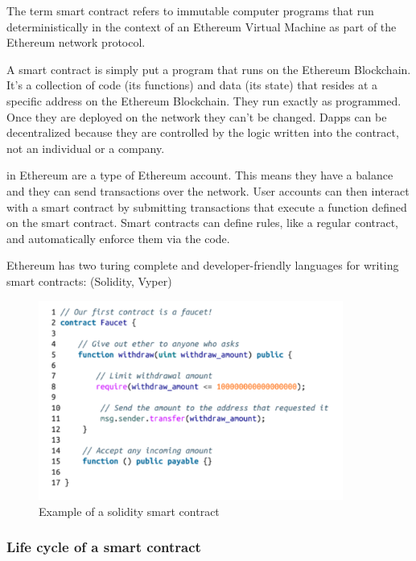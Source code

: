 The term smart contract refers to immutable computer programs that run deterministically in the context of an Ethereum Virtual Machine as part of the Ethereum network protocol\cite{antonopoulosMasteringEthereumBuilding2018}.

A smart contract is simply put a program that runs on the Ethereum Blockchain. It's a collection of code (its functions) and data (its state) that resides at a specific address on the Ethereum Blockchain. They run exactly as programmed. Once they are deployed on the network they can't be changed. Dapps can be decentralized because they are controlled by the logic written into the contract, not an individual or a company\cite{ethereumcommunityEthereumDevelopmentDocumentation}.

in Ethereum are a type of Ethereum account. This means they have a balance and they can send transactions over the network. User accounts can then interact with a smart contract by submitting transactions that execute a function defined on the smart contract. Smart contracts can define rules, like a regular contract, and automatically enforce them via the code.

Ethereum has two turing complete and developer-friendly languages for writing smart contracts: (Solidity, Vyper)

\begin{figure}[H]
	\centering
		\includegraphics[width=10cm]{images/chapter2/smart-contract-example.png}
		\caption{{\footnotesize Example of a solidity smart contract\cite{antonopoulosMasteringEthereumBuilding2018}}}
\end{figure}

\subsubsection{Life cycle of a smart contract}

